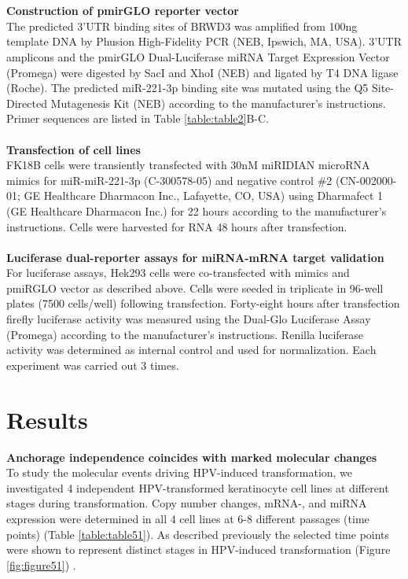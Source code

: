 \\
\\
\textbf{Construction of pmirGLO reporter vector}
\\
The predicted 3’UTR binding sites of BRWD3 was amplified from 100ng template DNA by Phusion High-Fidelity PCR (NEB, Ipswich, MA, USA). 3’UTR amplicons and the pmirGLO Dual-Luciferase miRNA Target Expression Vector (Promega) were digested by SacI and XhoI (NEB) and ligated by T4 DNA ligase (Roche). The predicted miR-221-3p binding site was mutated using the Q5 Site-Directed Mutagenesis Kit (NEB) according to the manufacturer’s instructions. Primer sequences are listed in Table \ref{table:table2}B-C.
\\
\\
\textbf{Transfection of cell lines}
\\
FK18B cells were transiently transfected with 30nM miRIDIAN microRNA mimics for miR-miR-221-3p (C-300578-05) and negative control $\#$2 (CN-002000-01; GE Healthcare Dharmacon Inc., Lafayette, CO, USA) using Dharmafect 1 (GE Healthcare Dharmacon Inc.) for 22 hours according to the manufacturer’s instructions. Cells were harvested for RNA 48 hours after transfection.
\\
\\
\textbf{Luciferase dual-reporter assays for miRNA-mRNA target validation}
\\
For luciferase assays, Hek293 cells were co-transfected with mimics and pmiRGLO vector as described above. Cells were seeded in triplicate in 96-well plates (7500 cells/well) following transfection. Forty-eight hours after transfection firefly luciferase activity was measured using the Dual-Glo Luciferase Assay (Promega) according to the manufacturer’s instructions. Renilla luciferase activity was determined as internal control and used for normalization. Each experiment was carried out 3 times. 

\section{Results}

\textbf{Anchorage independence coincides with marked molecular changes}
\\
To study the molecular events driving HPV-induced transformation, we investigated 4 independent HPV-transformed keratinocyte cell lines at different stages during transformation. Copy number changes, mRNA-, and miRNA expression were determined in all 4 cell lines at 6-8 different passages (time points) (Table \ref{table:table51}). As described previously the selected time points were shown to represent distinct stages in HPV-induced transformation (Figure \ref{fig:figure51}) \cite{Wilting2016}. 

